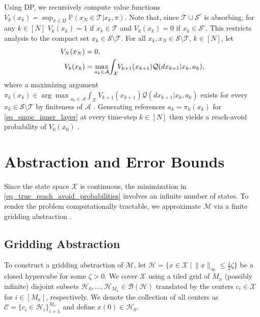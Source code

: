 \documentclass{IEEEtran}
\begin{document}
Using DP, we recursively compute value functions $V_k({x}_k)=\sup_{\pi\in\Pi}\mathbb{P}(x_N\in\mathcal{T}|{x}_k,\pi)$. Note that, since $\mathcal{T}\cup\mathcal{S}^c$ is absorbing, for any $k\in[N]$ $V_k({x}_k)=1$ if $x_k\in\mathcal{T}$ and $V_k({x}_k)=0$ if $x_k\in\mathcal{S}^c$. This restricts analysis to the compact set ${x}_k\in{\mathcal{S}}\setminus{\mathcal{T}}$. For all ${x}_k, {x}_N\in{\mathcal{S}}\setminus{\mathcal{T}}$, $k\in[N]$, let
\begin{subequations}
    \label{eq_true_reach_avoid_probabilities}
    \begin{align}
    V_N({x}_N) &= 0, \\
    V_k({x}_k) &= \max_{a_k\in\mathcal{A}} \!\int_{{\mathcal{X}}}\hspace{-.3em}V_{k+1}({x}_{k+1})\mathcal{Q}(d{x}_{k+1}|{x}_k,a_k),
\end{align}
\end{subequations}
where a maximizing argument $\pi_k({x}_k)\in{\arg\max}_{a_k\in\mathcal{A}} \int_{{\mathcal{X}}}V_{k+1}({x}_{k+1})\mathcal{Q}(d{x}_{k+1}|{x}_k,a_k)$ exists for every ${x}_k\in{\mathcal{S}\setminus\mathcal{T}}$ by finiteness of $\mathcal{A}$ \cite{schmid2022probabilistic}. Generating references $a_k=\pi_k(x_k)$ for \eqref{eq_smpc_inner_layer} at every time-step $k\in[N]$ then yields a reach-avoid probability of $V_0(x_0)$ \cite{abate2008probabilistic}. 

\section{Abstraction and Error Bounds}
\label{sec_abstraction}
Since the state space ${\mathcal{X}}$ is continuous, the minimization in \eqref{eq_true_reach_avoid_probabilities} involves an infinite number of states. To render the problem computationally tractable, we approximate $\mathcal{M}$ via a finite gridding abstraction \cite{abate2010approximate}. 

\subsection{Gridding Abstraction}
To construct a gridding abstraction of $\mathcal{M}$, let $\mathcal{H}=\{{x}\in{\mathcal{X}}\ | \ \|{x}\|_{\infty}\leq \frac{1}{2}\zeta\}$ be a closed hypercube for some $\zeta>0$. We cover $\mathcal{X}$ using a tiled grid of $M_x$ (possibly infinite) disjoint subsets $\mathcal{H}_0,\dots,\mathcal{H}_{M_x}\in \mathcal{B}(\mathcal{H})$ translated by the centers $c_i\in\mathcal{X}$ for $i\in[M_x]$, respectively. We denote the collection of all centers as $\mathcal{C}=\{{c}_i\in\mathcal{H}_i\}_{i=1}^{M_x}$ and define $x(0)\in\mathcal{H}_0$.
\end{document}
